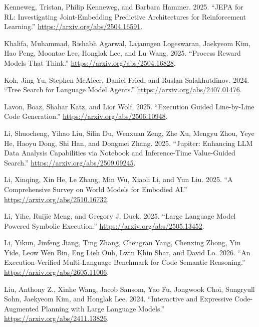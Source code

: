 \documentclass{article}
\newlength{\cslhangindent}
\newenvironment{CSLReferences}[2]
 {%
  \setlength{\parindent}{0pt}
  \everypar{\setlength{\hangindent}{\cslhangindent}}\ignorespaces
 }
 {\par}
\begin{document}
\begin{CSLReferences}{1}{0}
\leavevmode{}%
Kenneweg, Tristan, Philip Kenneweg, and Barbara Hammer. 2025. {``JEPA
for RL: Investigating Joint-Embedding Predictive Architectures for
Reinforcement Learning.''} \url{https://arxiv.org/abs/2504.16591}.

\leavevmode{}%
Khalifa, Muhammad, Rishabh Agarwal, Lajanugen Logeswaran, Jaekyeom Kim,
Hao Peng, Moontae Lee, Honglak Lee, and Lu Wang. 2025. {``Process Reward
Models That Think.''} \url{https://arxiv.org/abs/2504.16828}.

\leavevmode{}%
Koh, Jing Yu, Stephen McAleer, Daniel Fried, and Ruslan Salakhutdinov.
2024. {``Tree Search for Language Model Agents.''}
\url{https://arxiv.org/abs/2407.01476}.

\leavevmode{}%
Lavon, Boaz, Shahar Katz, and Lior Wolf. 2025. {``Execution Guided
Line-by-Line Code Generation.''} \url{https://arxiv.org/abs/2506.10948}.

\leavevmode{}%
Li, Shuocheng, Yihao Liu, Silin Du, Wenxuan Zeng, Zhe Xu, Mengyu Zhou,
Yeye He, Haoyu Dong, Shi Han, and Dongmei Zhang. 2025. {``Jupiter:
Enhancing LLM Data Analysis Capabilities via Notebook and Inference-Time
Value-Guided Search.''} \url{https://arxiv.org/abs/2509.09245}.

\leavevmode{}%
Li, Xinqing, Xin He, Le Zhang, Min Wu, Xiaoli Li, and Yun Liu. 2025.
{``A Comprehensive Survey on World Models for Embodied AI.''}
\url{https://arxiv.org/abs/2510.16732}.

\leavevmode{}%
Li, Yihe, Ruijie Meng, and Gregory J. Duck. 2025. {``Large Language
Model Powered Symbolic Execution.''}
\url{https://arxiv.org/abs/2505.13452}.

\leavevmode{}%
Li, Yikun, Jinfeng Jiang, Ting Zhang, Chengran Yang, Chenxing Zhong, Yin
Yide, Leow Wen Bin, Eng Lieh Ouh, Lwin Khin Shar, and David Lo. 2026.
{``An Execution-Verified Multi-Language Benchmark for Code Semantic
Reasoning.''} \url{https://arxiv.org/abs/2605.11006}.

\leavevmode{}%
Liu, Anthony Z., Xinhe Wang, Jacob Sansom, Yao Fu, Jongwook Choi,
Sungryull Sohn, Jaekyeom Kim, and Honglak Lee. 2024. {``Interactive and
Expressive Code-Augmented Planning with Large Language Models.''}
\url{https://arxiv.org/abs/2411.13826}.


\end{CSLReferences}
\end{document}
